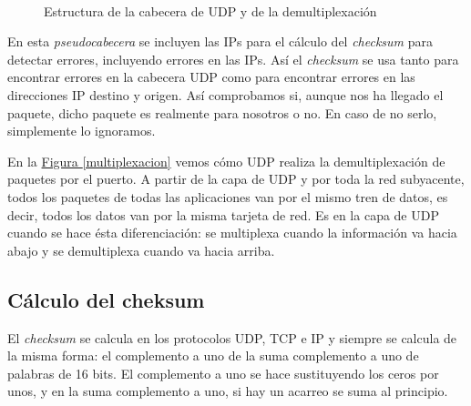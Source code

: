 \documentclass[10pt,a4paper,spanish]{report}
\begin{document}
\begin{figure}[!h]
\centering
\mbox {
\qquad
{}
}
\caption{Estructura de la cabecera de UDP y de la demultiplexación}
\label{UDP}
\end{figure}


En esta \textcolor{tema3}{\textit{pseudocabecera}} se incluyen las IPs para el cálculo del \textcolor{tema3}{\textit{checksum}} para detectar errores, incluyendo errores en las IPs. Así el \textcolor{tema3}{\textit{checksum}} se usa tanto para encontrar errores en la cabecera UDP como para encontrar errores en las direcciones IP destino y origen. Así comprobamos si, aunque nos ha llegado el paquete, dicho paquete es realmente para nosotros o no. En caso de no serlo, simplemente lo ignoramos. 

En la \hyperref[multiplexacion]{Figura \ref*{multiplexacion}} vemos cómo UDP realiza la demultiplexación de paquetes por el puerto. A partir de la capa de UDP y por toda la red subyacente, todos los paquetes de todas las aplicaciones van por el mismo tren de datos, es decir, todos los datos van por la misma tarjeta de red. Es en la capa de UDP cuando se hace ésta diferenciación: se multiplexa cuando la información va hacia abajo y se demultiplexa cuando va hacia arriba. 

\subsection{\textcolor{tema3}Cálculo del cheksum}
El \textcolor{tema3}{\textit{checksum}} se calcula en los protocolos UDP, TCP e IP y siempre se calcula de la misma forma: el complemento a uno de la suma complemento a uno de palabras de 16 bits. El complemento a uno se hace sustituyendo los ceros por unos, y en la suma complemento a uno, si hay un acarreo se suma al principio.
\end{document}
